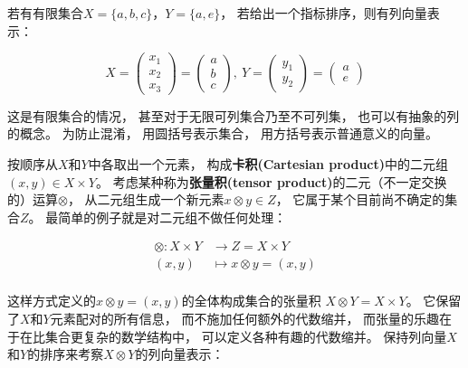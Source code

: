 \documentclass[10pt, openany]{book}
\begin{document}
若有有限集合$X = \{a,b,c\}$，$Y=\{a,e\}$，
若给出一个指标排序，则有列向量表示：

$$
X=\begin{pmatrix}x_1 \\ x_2 \\ x_3\end{pmatrix}=\begin{pmatrix}a \\ b \\ c\end{pmatrix},\ 
Y=\begin{pmatrix}y_1 \\ y_2\end{pmatrix}=\begin{pmatrix}a \\ e\end{pmatrix}
$$

这是有限集合的情况，
甚至对于无限可列集合乃至不可列集，
也可以有抽象的列的概念。
为防止混淆，
用圆括号表示集合，
用方括号表示普通意义的向量。

按顺序从$X$和$Y$中各取出一个元素，
构成\textbf{卡积(Cartesian product)}中的二元组
$(x,y) \in X \times Y$。
考虑某种称为\textbf{张量积(tensor product)}的二元（不一定交换的）运算$\otimes$，
从二元组生成一个新元素$x \otimes y\in Z$，
它属于某个目前尚不确定的集合$Z$。
最简单的例子就是对二元组不做任何处理：

$$
\begin{aligned}
\otimes: X \times Y &\to Z = X \times Y \\
(x,y) &\mapsto x \otimes y = (x,y) \\
\end{aligned}
$$

这样方式定义的$x \otimes y = (x,y)$的全体构成集合的张量积
$X \otimes Y = X \times Y$。
它保留了$X$和$Y$元素配对的所有信息，
而不施加任何额外的代数缩并，
而张量的乐趣在于在比集合更复杂的数学结构中，
可以定义各种有趣的代数缩并。
保持列向量$X$和$Y$的排序来考察$X \otimes Y$的列向量表示：
\end{document}
